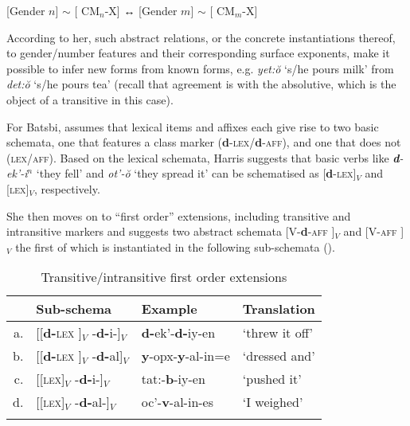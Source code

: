 \documentclass[output=paper]{langsci/langscibook}
\begin{document}
\begin{exe}
  \ex \label{ex:HarrisAnalog} {[Gender $n$] $\sim$ [ CM$_n$-X] ↔ [Gender $m$] $\sim$ [ CM$_m$-X]}
\end{exe}

According to her, such abstract relations, or the concrete
instantiations thereof, to gender/number features and their
corresponding surface exponents, make it possible to infer new forms
from known forms, e.g. \textit{yet:ŏ} `s/he pours milk' from
\textit{det:ŏ} `s/he pours tea' (recall that agreement is with
the absolutive, which is the object of a transitive in this case).

For Batsbi, \citet{Harris09} assumes that lexical items and affixes
each give rise to two basic schemata, one that features a class marker
(\textbf{d}-\textsc{lex}/\textbf{d}-\textsc{aff}), and one that does
not (\textsc{lex}/\textsc{aff}). Based on the lexical schemata, Harris
suggests that basic verbs like \textit{\textbf{d}-ek’-i$^n$} ‘they
fell' and \textit{ot’-ŏ} `they spread it' can be schematised as
[\textbf{d}-\textsc{lex}]$_V$ and [\textsc{lex}]$_V$,
respectively. 

She then moves on to ``first order'' extensions, including transitive
and intransitive markers and suggests two abstract schemata
[V-\textbf{d}-\textsc{aff} ]$_V$ and [V-\textsc{aff} ]$_V$ the first
of which is instantiated in the following sub-schemata ().  

\begin{table}[h]
  \caption{Transitive/intransitive first order extensions \label{ex:HarrisFirstOrder}}
  \begin{tabular}{rlll}
    \lsptoprule
      & Sub-schema & Example & Translation\\
    \midrule
    a. & [[\textbf{d-}\textsc{lex} ]$_V$ -\textbf{d-}i-]$_V$ &
                                                      \textbf{d-}ek’-\textbf{d-}iy-en & ‘threw it off’\\
    b. & [[\textbf{d-}\textsc{lex} ]$_V$ -\textbf{d-}al]$_V$ &
                                                      \textbf{y}-opx-\textbf{y}-al-in=e & ‘dressed and’\\
    c. & [[\textsc{lex}]$_V$ -\textbf{d-}i-]$_V$ &
                                          tat:-\textbf{b}-iy-en & ‘pushed it’  \\
    d. & [[\textsc{lex}]$_V$ -\textbf{d-}al-]$_V$ &
                                           oc’-\textbf{v}-al-in-es & ‘I weighed’ \\
    \lspbottomrule
  \end{tabular}
\end{table}
\end{document}
